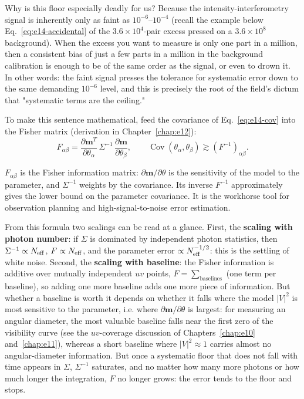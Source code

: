 Why is this floor especially deadly for us? Because the intensity-interferometry signal is inherently only as faint as $10^{-6}$--$10^{-4}$ (recall the example below Eq.~\eqref{eq:e14-accidental} of the $3.6\times10^4$-pair excess pressed on a $3.6\times10^8$ background). When the excess you want to measure is only one part in a million, then a consistent bias of just a few parts in a million in the background calibration is enough to be of the same order as the signal, or even to drown it. In other words: the faint signal presses the tolerance for systematic error down to the same demanding $10^{-6}$ level, and this is precisely the root of the field's dictum that "systematic terms are the ceiling."

To make this sentence mathematical, feed the covariance of Eq.~\eqref{eq:e14-cov} into the Fisher matrix (derivation in Chapter~\ref{chap:e12}):
\begin{equation}
  F_{\alpha\beta}
  =\frac{\partial\bm m^{T}}{\partial\theta_\alpha}\,\Sigma^{-1}\,\frac{\partial\bm m}{\partial\theta_\beta},
  \qquad
  \operatorname{Cov}(\theta_\alpha,\theta_\beta)\gtrsim(F^{-1})_{\alpha\beta} .
  \label{eq:e14-fisher}
\end{equation}
\begin{formulaexplain}
$F_{\alpha\beta}$ is the Fisher information matrix: $\partial\bm m/\partial\theta$ is the sensitivity of the model to the parameter, and $\Sigma^{-1}$ weights by the covariance. Its inverse $F^{-1}$ approximately gives the lower bound on the parameter covariance. It is the workhorse tool for observation planning and high-signal-to-noise error estimation.
\end{formulaexplain}
From this formula two scalings can be read at a glance. First, the \textbf{scaling with photon number}: if $\Sigma$ is dominated by independent photon statistics, then $\Sigma^{-1}\propto N_{\rm eff}$, $F\propto N_{\rm eff}$, and the parameter error $\propto N_{\rm eff}^{-1/2}$: this is the settling of white noise. Second, the \textbf{scaling with baseline}: the Fisher information is additive over mutually independent $uv$ points, $F=\sum_{\text{baselines}}$ (one term per baseline), so adding one more baseline adds one more piece of information. But whether a baseline is worth it depends on whether it falls where the model $|V|^2$ is most sensitive to the parameter, i.e. where $\partial\bm m/\partial\theta$ is largest: for measuring an angular diameter, the most valuable baseline falls near the first zero of the visibility curve (see the $uv$-coverage discussion of Chapters~\ref{chap:e10} and~\ref{chap:e11}), whereas a short baseline where $|V|^2\approx1$ carries almost no angular-diameter information. But once a systematic floor that does not fall with time appears in $\Sigma$, $\Sigma^{-1}$ saturates, and no matter how many more photons or how much longer the integration, $F$ no longer grows: the error tends to the floor and stops.

